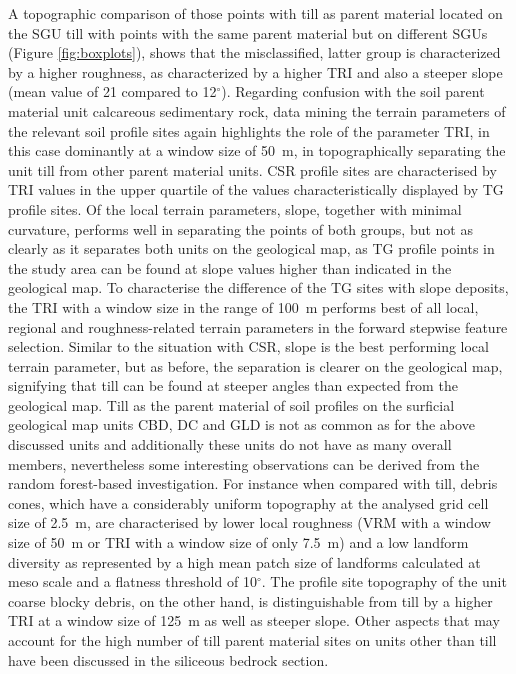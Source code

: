 \documentclass[preprint,12pt,authoryear]{elsarticle}
\begin{document}
 A topographic comparison of those points with till as parent material located on the SGU till with points with the same parent material but on different SGUs (Figure \ref{fig:boxplots}), shows that the misclassified, latter group is characterized by a higher roughness, as characterized by a higher TRI and also a steeper slope (mean value of 21 compared to 12$^{\circ}$). Regarding confusion with the soil parent material unit calcareous sedimentary rock, data mining the terrain parameters of the relevant soil profile sites again highlights the role of the parameter TRI, in this case dominantly at a window size of 50~m, in topographically separating the unit till from other parent material units. CSR profile sites are characterised by TRI values in the upper quartile of the values characteristically displayed by TG profile sites. Of the local terrain parameters, slope, together with minimal curvature, performs well in separating the points of both groups, but not as clearly as it separates both units on the geological map, as TG profile points in the study area can be found at slope values higher than indicated in the geological map. To characterise the difference of the TG sites with slope deposits, the TRI with a window size in the range of 100~m performs best of all local, regional and roughness-related terrain parameters in the forward stepwise feature selection. Similar to the situation with CSR, slope is the best performing local terrain parameter, but as before, the separation is clearer on the geological map, signifying that till can be found at steeper angles than   expected from the geological map. Till as the parent material of soil profiles on the surficial geological map units CBD, DC and GLD is not as common as for the above discussed units and additionally these units do not have as many overall members, nevertheless some interesting observations can be derived from the random forest-based investigation. For instance when compared with till, debris cones, which have a considerably uniform topography at the analysed grid cell size of 2.5~m, are characterised by lower local roughness (VRM with a window size of 50~m or TRI with a window size of only 7.5~m) and a low landform diversity as represented by a high mean patch size of landforms calculated at meso scale and a flatness threshold of 10$^{\circ}$. The profile site topography of the unit coarse blocky debris, on the other hand, is distinguishable from till by a higher TRI at a window size of 125~m as well as steeper slope. Other aspects that may account for the high number of till parent material sites on units other than till have been discussed in the siliceous bedrock section.
 
\end{document}
